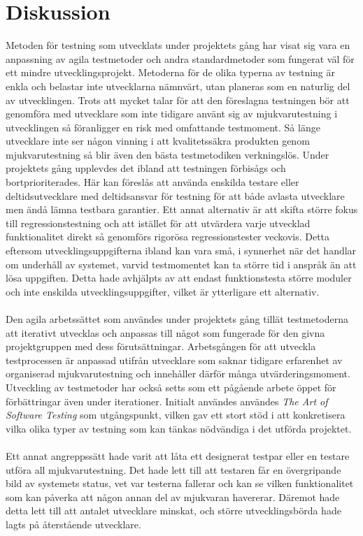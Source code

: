 \section{Diskussion}
\label{cha:joakim-discussion}
Metoden för testning som utvecklats under projektets gång har visat sig vara en anpassning av agila testmetoder och andra standardmetoder som fungerat väl för ett mindre utvecklingsprojekt. Metoderna för de olika typerna av testning är enkla och belastar inte utvecklarna nämnvärt, utan planeras som en naturlig del av utvecklingen. Trots att mycket talar för att den föreslagna testningen bör att genomföra med utvecklare som inte tidigare använt sig av mjukvarutestning i utvecklingen så föranligger en risk med omfattande testmoment. Så länge utvecklare inte ser någon vinning i att kvalitetssäkra produkten genom mjukvarutestning så blir även den bästa testmetodiken verkningslös. Under projektets gång upplevdes det ibland att testningen förbisågs och bortprioriterades. Här kan föreslås att använda enskilda testare eller deltidsutvecklare med deltidsansvar för testning för att både avlasta utvecklare men ändå lämna testbara garantier. Ett annat alternativ är att skifta större fokus till regressionstestning och att istället för att utvärdera varje utvecklad funktionalitet direkt så genomförs rigorösa regressionstester veckovis. Detta eftersom utvecklingsuppgifterna ibland kan vara små, i synnerhet när det handlar om underhåll av systemet, varvid testmomentet kan ta större tid i anspråk än att lösa uppgiften. Detta hade avhjälpts av att endast funktionstesta större moduler och inte enskilda utvecklingsuppgifter, vilket är ytterligare ett alternativ. \\
\\
Den agila arbetssättet som användes under projektets gång tillät testmetoderna att iterativt utvecklas och anpassas till något som fungerade för den givna projektgruppen med dess förutsättningar.
Arbetsgången för att utveckla testprocessen är anpassad utifrån utvecklare som saknar tidigare erfarenhet av organiserad mjukvarutestning och innehåller därför många utvärderingsmoment. Utveckling av testmetoder har också setts som ett pågående arbete öppet för förbättringar även under iterationer. Initialt användes användes \emph{The Art of Software Testing} som utgångspunkt, vilken gav ett stort stöd i att konkretisera vilka olika typer av testning som kan tänkas nödvändiga i det utförda projektet.\cite{book:artoftesting}\\
\\
Ett annat angreppssätt hade varit att låta ett designerat testpar eller en testare utföra all mjukvarutestning. Det hade lett till att testaren får en övergripande bild av systemets status, vet var testerna fallerar och kan se vilken funktionalitet som kan påverka att någon annan del av mjukvaran havererar. Däremot hade detta lett till att antalet utvecklare minskat, och större utvecklingsbörda hade lagts på återstående utvecklare.


